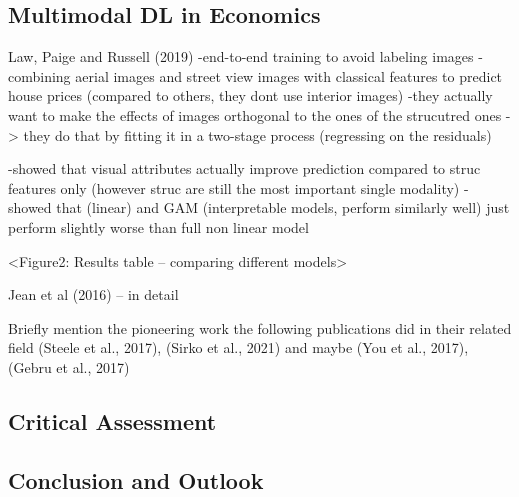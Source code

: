 \documentclass[
]{krantz}
\begin{document}
\hypertarget{multimodal-dl-in-economics}{%
\subsection{Multimodal DL in Economics}\label{multimodal-dl-in-economics}}

Law, Paige and Russell (2019)
-end-to-end training to avoid labeling images
-combining aerial images and street view images with classical features to predict house prices
(compared to others, they dont use interior images)
-they actually want to make the effects of images orthogonal to the ones of the strucutred ones -\textgreater{} they do that by fitting it in a two-stage process (regressing on the residuals)

-showed that visual attributes actually improve prediction compared to struc features only (however struc are still the most important single modality)
-showed that (linear) and GAM (interpretable models, perform similarly well) just perform slightly worse than full non linear model

\textless Figure2: Results table -- comparing different models\textgreater{}

Jean et al (2016) -- in detail

Briefly mention the pioneering work the following publications did in their related field
(Steele et al., 2017), (Sirko et al., 2021) and maybe (You et al., 2017), (Gebru et al., 2017)

\hypertarget{critical-assessment}{%
\subsection{Critical Assessment}\label{critical-assessment}}

\hypertarget{conclusion-and-outlook}{%
\subsection{Conclusion and Outlook}\label{conclusion-and-outlook}}
\end{document}
